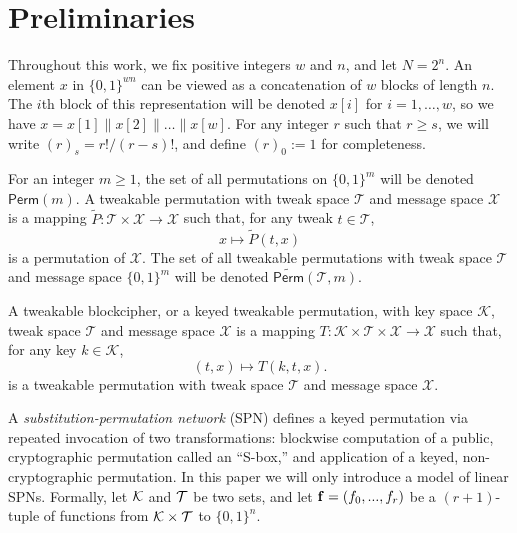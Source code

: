 

\section{Preliminaries}
\label{sec:preliminary}

Throughout this work, we fix positive integers $w$ and $n$, and let $N=2^n$. An element $x$ in $\{0,1\}^{wn}$ can be viewed as a concatenation of $w$ blocks of length $n$. The $i$th block of this representation will be denoted $x[i]$ for $i=1,\ldots,w$, so we have $x=x[1]\|x[2]\|\ldots\|x[w]$. For any integer $r$ such that $r\geq s$, we will write $(r)_s = r!/(r-s)!$, and define $(r)_0:=1$ for completeness.





\arrangespace


{}
%
%
For an integer $m\geq1$, the set of all permutations on $\{0, 1\}^m$ will be denoted $\textsf{Perm}(m)$. A tweakable permutation with tweak space
$\mathcal{T}$ and message space $\mathcal{X}$ is a mapping $\widetilde{P}:\mathcal{T}\times\mathcal{X}\rightarrow\mathcal{X}$ such that, for any tweak
$t\in\mathcal{T}$,
%
$$x\mapsto\widetilde{P}(t,x)$$
%
is a permutation of $\mathcal{X}$. The set of all tweakable permutations with tweak space
$\mathcal{T}$ and message space $\{0, 1\}^m$ will be denoted $\widetilde{\textsf{Perm}}(\mathcal{T},m)$.


A tweakable blockcipher, or a keyed tweakable permutation, with key space $\mathcal{K}$, tweak space $\mathcal{T}$ and message
space $\mathcal{X}$ is a mapping $T:\mathcal{K}\times\mathcal{T}\times\mathcal{X}\rightarrow\mathcal{X}$ such that, for any key $k\in\mathcal{K}$,
%
$$(t,x)\mapsto T(k,t,x).$$
%
is a tweakable permutation with tweak space $\mathcal{T}$ and message space $\mathcal{X}$.




\arrangespace
{}
%
A \emph{substitution-permutation network} (SPN) defines a keyed permutation via repeated invocation of two transformations: blockwise computation of a public, cryptographic permutation called an ``S-box,'' and application of a keyed, non-cryptographic permutation. In this paper we will only introduce a model of linear SPNs. Formally, let $\mathcal{K}$ and $\mathcal{T}$ be two
sets, and let $\mathbf{f}= (f_0,...,f_r)$ be a $(r+1)$-tuple of functions from $\mathcal{K}\times\mathcal{T}$ to $\{0, 1\}^n$.

